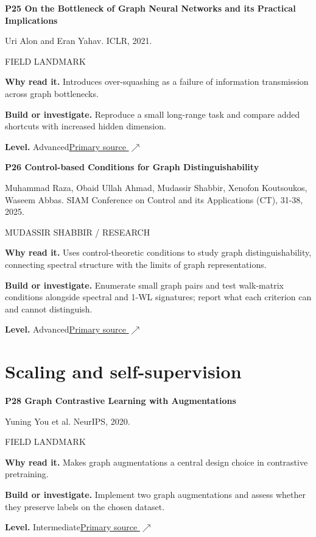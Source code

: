\documentclass[11pt,letterpaper]{article}
\begin{document}
\begin{minipage}{\linewidth}
{\large\bfseries P25 On the Bottleneck of Graph Neural Networks and its Practical Implications}\par
Uri Alon and Eran Yahav. ICLR, 2021.\par
\textcolor{ink}{\small FIELD LANDMARK}\par
\textbf{Why read it.} Introduces over-squashing as a failure of information transmission across graph bottlenecks.\par
\textbf{Build or investigate.} Reproduce a small long-range task and compare added shortcuts with increased hidden dimension.\par
\textbf{Level.} Advanced\quad\href{https://arxiv.org/abs/2006.05205}{Primary source $\nearrow$}\par
\end{minipage}\par\vspace{10pt}
\begin{minipage}{\linewidth}
{\large\bfseries P26 Control-based Conditions for Graph Distinguishability}\par
Muhammad Raza, Obaid Ullah Ahmad, Mudassir Shabbir, Xenofon Koutsoukos, Waseem Abbas. SIAM Conference on Control and its Applications (CT), 31-38, 2025.\par
\textcolor{ink}{\small MUDASSIR SHABBIR / RESEARCH}\par
\textbf{Why read it.} Uses control-theoretic conditions to study graph distinguishability, connecting spectral structure with the limits of graph representations.\par
\textbf{Build or investigate.} Enumerate small graph pairs and test walk-matrix conditions alongside spectral and 1-WL signatures; report what each criterion can and cannot distinguish.\par
\textbf{Level.} Advanced\quad\href{https://doi.org/10.1137/1.9781611978742.5}{Primary source $\nearrow$}\par
\end{minipage}\par\vspace{10pt}
\section*{Scaling and self-supervision}
\begin{minipage}{\linewidth}
{\large\bfseries P28 Graph Contrastive Learning with Augmentations}\par
Yuning You et al. NeurIPS, 2020.\par
\textcolor{ink}{\small FIELD LANDMARK}\par
\textbf{Why read it.} Makes graph augmentations a central design choice in contrastive pretraining.\par
\textbf{Build or investigate.} Implement two graph augmentations and assess whether they preserve labels on the chosen dataset.\par
\textbf{Level.} Intermediate\quad\href{https://arxiv.org/abs/2010.13902}{Primary source $\nearrow$}\par
\end{minipage}\par\vspace{10pt}
\end{document}
